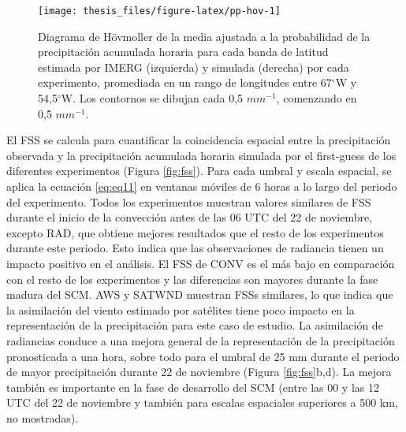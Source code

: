 \documentclass[12pt,oneside,a4paper]{reedthesis}
\begin{document}
\begin{figure}

{\centering \texttt{[image: thesis\_files/figure-latex/pp-hov-1]} 

}

\caption{Diagrama de Hövmoller de la media ajustada a la probabilidad de la precipitación acumulada horaria para cada banda de latitud estimada por IMERG (izquierda) y simulada (derecha) por cada experimento, promediada en un rango de longitudes entre 67\(^{\circ}\)W y 54,5\(^{\circ}\)W. Los contornos se dibujan cada 0,5 \(mm^{-1}\), comenzando en 0,5 \(mm^{-1}\).}\label{fig:pp-hov}
\end{figure}
El FSS se calcula para cuantificar la coincidencia espacial entre la precipitación observada y la precipitación acumulada horaria simulada por el first-guess de los diferentes experimentos (Figura \ref{fig:fss}). Para cada umbral y escala espacial, se aplica la ecuación \eqref{eq:eq11} en ventanas móviles de 6 horas a lo largo del periodo del experimento. Todos los experimentos muestran valores similares de FSS durante el inicio de la convección antes de las 06 UTC del 22 de noviembre, excepto RAD, que obtiene mejores resultados que el resto de los experimentos durante este periodo. Esto indica que las observaciones de radiancia tienen un impacto positivo en el análisis. El FSS de CONV es el más bajo en comparación con el resto de los experimentos y las diferencias son mayores durante la fase madura del SCM. AWS y SATWND muestran FSSs similares, lo que indica que la asimilación del viento estimado por satélites tiene poco impacto en la representación de la precipitación para este caso de estudio. La asimilación de radiancias conduce a una mejora general de la representación de la precipitación pronosticada a una hora, sobre todo para el umbral de 25 mm durante el periodo de mayor precipitación durante 22 de noviembre (Figura \ref{fig:fss}b,d). La mejora también es importante en la fase de desarrollo del SCM (entre las 00 y las 12 UTC del 22 de noviembre y también para escalas espaciales superiores a 500 km, no mostradas).
\end{document}
